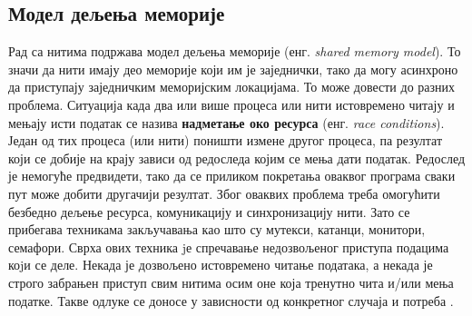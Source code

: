 \documentclass[12pt,oneside]{memoir}
\begin{document}
\subsection{Модел дељења меморије}
Рад са нитима подржава модел дељења меморије (енг. \textit{shared memory model}). То значи да нити имају део меморије који им је заједнички, тако да могу асинхроно да приступају заједничким меморијским локацијама. То може довести до разних проблема. Ситуација када два или више процеса или нити истовремено читају и мењају исти податак се назива \textbf{надметање око ресурса} (енг. \textit{race conditions}). Један од тих процеса (или нити) поништи измене другог процеса, па резултат који се добије на крају зависи од редоследа којим се мења дати податак. Редослед је немогуће предвидети, тако да се приликом покретања оваквог програма сваки пут може добити другачији резултат. Због оваквих проблема треба омогућити безбедно дељење ресурса, комуникацију и синхронизацију нити. Зато се прибегава техникама закључавања као што су мутекси, катанци, монитори, семафори. Сврха ових техника jе спречавање недозвољеног приступа подацима коjи се деле. Некада је дозвољено истовремено читање података, а некада је строго забрањен приступ свим нитима осим оне која тренутно чита и/или мења податке. Такве одлуке се доносе у зависности од конкретног случаја и потреба \cite{progInScala3, survey}.
\end{document}
